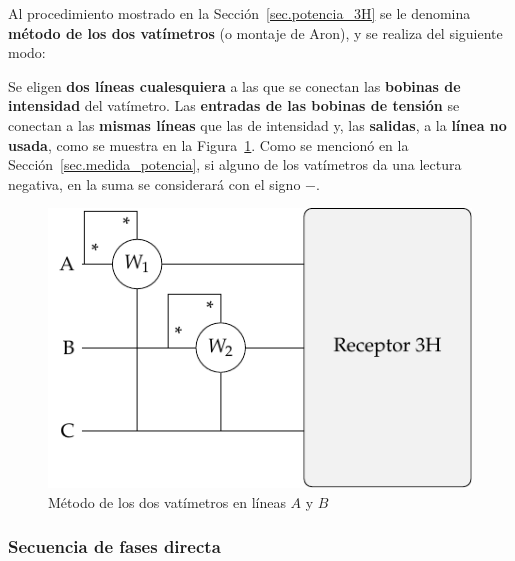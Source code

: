 \documentclass[11pt]{book} %
\begin{document}
	Al procedimiento mostrado en la Sección~\ref{sec.potencia_3H} se le denomina \textbf{método de los dos vatímetros} (o montaje de Aron), y se realiza del siguiente modo: 
	
	Se eligen \textbf{dos líneas cualesquiera} a las que se conectan las \textbf{bobinas de intensidad} del vatímetro. Las \textbf{entradas de las bobinas de tensión} se conectan a las \textbf{mismas líneas} que las de intensidad y, las \textbf{salidas}, a la \textbf{línea no usada}, como se muestra en la Figura~\ref{fig.potencia3H}. Como se mencionó en la Sección~\ref{sec.medida_potencia}, si alguno de los vatímetros da una lectura negativa, en la suma se considerará con el signo $-$.   
	\begin{figure}[htbp]
	    \centering
	    \includegraphics{../figs/Potencia3H.pdf}
	    \caption{Método de los dos vatímetros en líneas $A$ y $B$}
	    \label{fig.potencia3H}
	\end{figure}
	
	\subsubsection{Secuencia de fases directa}
	
\end{document}
